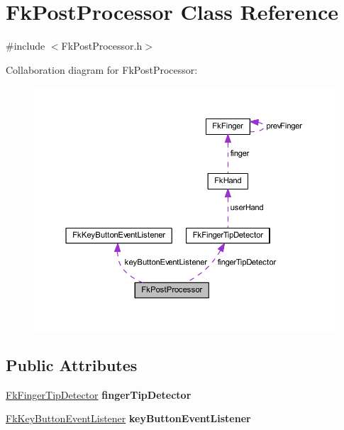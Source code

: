 \hypertarget{class_fk_post_processor}{}\section{Fk\+Post\+Processor Class Reference}
\label{class_fk_post_processor}


{\ttfamily \#include $<$Fk\+Post\+Processor.\+h$>$}



Collaboration diagram for Fk\+Post\+Processor\+:\nopagebreak
\begin{figure}[H]
\begin{center}
\leavevmode
\includegraphics[width=350pt]{class_fk_post_processor__coll__graph}
\end{center}
\end{figure}
\subsection*{Public Attributes}
\begin{DoxyCompactItemize}
\item 
\hypertarget{class_fk_post_processor_a9fc004c9ccfd2ff8d40685d493484f88}{}\hyperlink{class_fk_finger_tip_detector}{Fk\+Finger\+Tip\+Detector} {\bfseries finger\+Tip\+Detector}\label{class_fk_post_processor_a9fc004c9ccfd2ff8d40685d493484f88}

\item 
\hypertarget{class_fk_post_processor_a7478ef484646566ade5509af57e1ca16}{}\hyperlink{class_fk_key_button_event_listener}{Fk\+Key\+Button\+Event\+Listener} {\bfseries key\+Button\+Event\+Listener}\label{class_fk_post_processor_a7478ef484646566ade5509af57e1ca16}

\end{DoxyCompactItemize}


